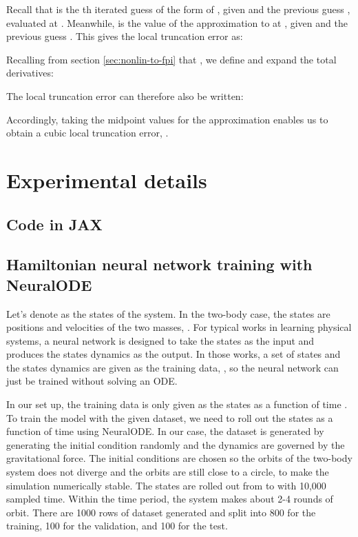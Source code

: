 Recall that  is the th iterated guess of the form of , given  and the previous guess , evaluated at . Meanwhile,  is the value of the approximation to  at , given  and the previous guess .
This gives the local truncation error as: 

Recalling from section \ref{sec:nonlin-to-fpi} that , we define  and expand the total derivatives:

The local truncation error can therefore also be written:
 

Accordingly, taking the midpoint values for the approximation enables us to obtain a cubic local truncation error, . 

\section{Experimental details}

\subsection{Code in JAX}
\label{appsubsec:code-in-jax}





\subsection{Hamiltonian neural network training with NeuralODE}
\label{appsec:hnn-training-details}

Let's denote  as the states of the system.
In the two-body case, the states are positions and velocities of the two masses, .
For typical works in learning physical systems, a neural network is designed to take the states  as the input and produces the states dynamics  as the output.
In those works, a set of states and the states dynamics are given as the training data, , so the neural network can just be trained without solving an ODE.

In our set up, the training data is only given as the states as a function of time .
To train the model with the given dataset, we need to roll out the states as a function of time  using NeuralODE.
In our case, the dataset is generated by generating the initial condition randomly and the dynamics are governed by the gravitational force.
The initial conditions are chosen so the orbits of the two-body system does not diverge and the orbits are still close to a circle, to make the simulation numerically stable.
The states are rolled out from  to  with 10,000 sampled time.
Within the time period, the system makes about 2-4 rounds of orbit.
There are 1000 rows of dataset generated and split into 800 for the training, 100 for the validation, and 100 for the test.

